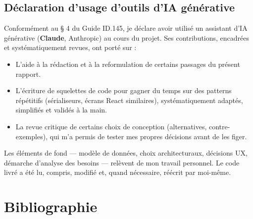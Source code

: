 \documentclass[12pt, a4paper, oneside]{report}
\begin{document}
\section{Déclaration d'usage d'outils d'IA générative}
Conformément au § 4 du Guide ID.145, je déclare avoir utilisé un
assistant d'IA générative (\textbf{Claude}, Anthropic) au cours du
projet. Ses contributions, encadrées et systématiquement revues, ont
porté sur :

\begin{itemize}
  \item L'aide à la rédaction et à la reformulation de certains
        passages du présent rapport.
  \item L'écriture de squelettes de code pour gagner du temps sur
        des patterns répétitifs (sérialiseurs, écrans React
        similaires), systématiquement adaptés, simplifiés et
        validés à la main.
  \item La revue critique de certains choix de conception
        (alternatives, contre-exemples), qui m'a permis de tester
        mes propres décisions avant de les figer.
\end{itemize}

Les éléments de fond — modèle de données, choix architecturaux,
décisions UX, démarche d'analyse des besoins — relèvent de mon
travail personnel. Le code livré a été lu, compris, modifié et,
quand nécessaire, réécrit par moi-même.

\newpage

\chapter*{Bibliographie}
\end{document}
